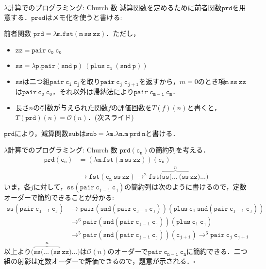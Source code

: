 \documentclass[9pt]{beamer}
\begin{document}
\begin{frame}{$\lambda$計算でのプログラミング: Church 数}
	減算関数を定めるために前者関数$\mathtt{prd}$を用意する．$\mathtt{pred}$はメモ化を使うと書ける:
	\begin{dblock}{前者関数}
		$\mathtt{prd = \lambda m . fst(m\ ss\ zz)}$．ただし，\begin{itemize}
			\item $\mathtt{zz = pair\ c_{0}\ c_{0}}$
			\item $\mathtt{ss = \lambda p. pair(snd\ p)\ (plus\ c_{1}\ (snd\ p))}$
		\end{itemize}
	\end{dblock}
\begin{itemize}
	\item $\mathtt{ss}$は二つ組$\mathtt{pair\ c_{i}\ c_{j}}$を取り$\mathtt{pair\ c_{j}\ c_{j + 1}}$を返すから，$m = 0$のとき項$\mathtt{m\ ss\ zz}$は$\mathtt{pair\ c_{0}\ c_{0}}$，それ以外は帰納法により$\mathtt{pair\ c_{m - 1}\ c_{m}}$．

	\item 長さ$n$の引数が与えられた関数$f$の評価回数を$T(f)(n)$と書くと，$T(\mathtt{prd})(n) = \mathcal{O}(n)$．(次スライド)
	\end{itemize}
	$\mathtt{prd}$により，減算関数$\mathtt{sub}$は$\mathtt{sub = \lambda m.\lambda n. m\ prd\ n}$と書ける．
\end{frame}
\begin{frame}{$\lambda$計算でのプログラミング: Church 数}
	$\mathtt{\mathtt{prd}(c_{n})}$の簡約列を考える．
			\begin{align*}
				\mathtt{prd(c_{n})} &= \mathtt{(\lambda m . fst(m\ ss\ zz))(c_{n})}\\
					&\rightarrow \mathtt{fst(c_{n}\ ss\ zz)} \rightarrow^{2}\mathtt{fst}(\overbrace{\mathtt{ss(\ldots\ (ss}}^{n}\ \mathtt{zz)\ldots)}
			\end{align*}
		いま，各$j$に対して，$\mathtt{ss(pair\ c_{j- 1}\ c_{j})}$の簡約列は次のように書けるので，定数オーダーで簡約できることが分かる:
		\begin{align*}
			\mathtt{ss(pair\ c_{j - 1}\ c_{j})}&\rightarrow \mathtt{pair(snd(pair\ c_{j - 1}\ c_{j}))(plus\ c_{1}\ snd(pair\ c_{j- 1}\ c_{j}))}\\
				&\rightarrow^{6}\mathtt{pair(snd(pair\ c_{j - 1}\ c_{j}))(plus\ c_{1}\ c_{j})}\\
				&\rightarrow^{5}\mathtt{pair(snd(pair\ c_{j - 1}\ c_{j}))(c_{j + 1})}\rightarrow^{6}\mathtt{pair\ c_{j}\ c_{j + 1}}
		\end{align*}
		以上より$(\overbrace{\mathtt{ss(\ldots\ (ss}}^{n}\ \mathtt{zz)\ldots)}$は$\mathcal{O}(n)$のオーダーで$\mathtt{pair\ c_{n-1}\ c_{n}}$に簡約できる．二つ組の射影は定数オーダーで評価できるので，題意が示される．$\square$
\end{frame}
\end{document}
